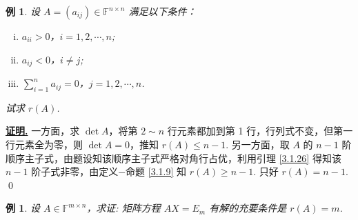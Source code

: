 \documentclass[10pt,openany]{article}
\theoremstyle{thmstyle} %
\theoremstyle{defstyle} %
\theoremstyle{prostyle} %
\theoremstyle{exastyle}
\newtheorem{example}[theorem]{例}
\theoremstyle{remstyle}
\renewenvironment{proof}[1][证明]{\par\underline{\textbf{#1.}} \;\fangsong}{\qed\par}
\newcommand{\F}{\mathbb{F}}
\newcommand{\n}{^{n \times n}}
\newcommand{\mn}{^{m \times n}}
\begin{document}
\begin{example}
	设 \( A = (a_{ij}) \in \F\n \) 满足以下条件：
	\begin{enumerate}[(i)]
		\item \( a_{ii} > 0 \)，\( i = 1, 2, \cdots, n \);
		\item \( a_{ij} < 0 \)，\( i \neq j \);
		\item \( \sum_{i=1}^{n} a_{ij} = 0 \)，\( j = 1, 2, \cdots, n \).
	\end{enumerate}
	
	试求 \( r(A) \).
\end{example}

\begin{proof}
	一方面，求 \( \det A \)，将第 \( 2 \sim n \) 行元素都加到第 1 行，行列式不变，但第一行元素全为零，则 \( \det A=0 \)，推知 \( r(A) \leq n-1 \). 另一方面，取 \( A \) 的 \( n-1 \) 阶顺序主子式，由题设知该顺序主子式严格对角行占优，利用引理 \ref{3.1.26} 得知该 \( n-1 \) 阶子式非零，由定义\(-\)命题 \ref{3.1.9} 知 \( r(A) \geq n-1 \). 只好 \( r(A)=n-1 \).
\end{proof}


\begin{example} \label{3.1.28}
	设 \( A \in \F\mn \)，求证: 矩阵方程 \( AX = E_m \) 有解的充要条件是 \( r(A) = m \).
\end{example}
\end{document}
